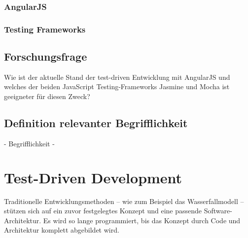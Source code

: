 \subsubsection{AngularJS}

\subsubsection{Testing Frameworks}

\subsection{Forschungsfrage}
Wie ist der aktuelle Stand der test-driven Entwicklung mit AngularJS und welches der beiden JavaScript Testing-Frameworks {\glqq Jasmine\grqq} und {\glqq Mocha\grqq} ist geeigneter für diesen Zweck?

\subsection{Definition relevanter Begrifflichkeit}
 - Begrifflichkeit -

\newpage

\section{Test-Driven Development}
\label{section:Test-Driven Development}
\begin{center}
 \autocite[22]{Johansen:2011}
\end{center}
Traditionelle Entwicklungsmethoden -- wie zum Beispiel das Wasserfallmodell -- stützen sich auf ein zuvor festgelegtes Konzept und eine passende Software-Architektur. Es wird so lange programmiert, bis das Konzept durch Code und Architektur komplett abgebildet wird.

